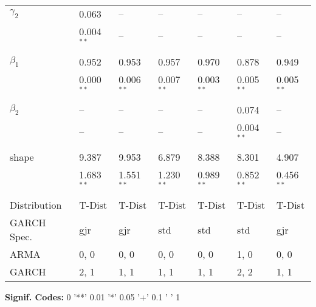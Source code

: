 \documentclass[12pt]{article}
\begin{document}
\begin{table}
\begin{tabular}{l l l l | l l l}
         $\gamma_{2}$  &  0.063           &    --        &    --        &    --        &    --        &    --        \\
                       &  0.004$^{**}$    &    --        &    --        &    --        &    --        &    --        \\ \\
         $\beta_{1}$   &  0.952           & 0.953        & 0.957        & 0.970        & 0.878        & 0.949        \\
                       &  0.000$^{**}$    & 0.006$^{**}$ & 0.007$^{**}$ & 0.003$^{**}$ & 0.005$^{**}$ & 0.005$^{**}$ \\ \\
         $\beta_{2}$   &     --           &    --        &    --        &    --        & 0.074        &    --        \\
                       &     --           &    --        &    --        &    --        & 0.004$^{**}$ &    --        \\ \\
         shape         &  9.387           & 9.953        & 6.879        & 8.388        & 8.301        & 4.907        \\
                       &  1.683$^{**}$    & 1.551$^{**}$ & 1.230$^{**}$ & 0.989$^{**}$ & 0.852$^{**}$ & 0.456$^{**}$ \\ \\
		 Distribution  & T-Dist           & T-Dist       & T-Dist       & T-Dist       & T-Dist       & T-Dist       \\
		 GARCH Spec.   & gjr              &   gjr        &    std       &    std       &    std       &  gjr         \\
		 ARMA          &  0, 0            &  0, 0        &   0, 0       &   0, 0       &   1, 0       &  0, 0        \\
		 GARCH         &  2, 1            &  1, 1        &   1, 1       &   1, 1       &   2, 2       &  1, 1        \\
		\midrule
	\end{tabular}
	\begin{tablenotes}
		\item{\footnotesize \textbf{Signif. Codes:} 0 '**' 0.01 '*' 0.05 '+' 0.1 ' ' 1}
	\end{tablenotes}
	\label{tbl:marginal_model_regressions}
\end{table}
\end{document}
